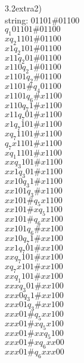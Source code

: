 \documentclass[11pt]{article}
\begin{document}
\noindent3.2extra2)\\
string: 01101\#01100\\
$q_1 0 1 1 0 1 \# 0 1 1 0 0$\\
$x q_2 1 1 0 1 \# 0 1 1 0 0$\\
$x 1 q_2 1 0 1 \# 0 1 1 0 0$\\
$x 1 1 q_2 0 1 \# 0 1 1 0 0$\\
$x 1 1 0 q_2 1 \# 0 1 1 0 0$\\
$x 1 1 0 1 q_2 \# 0 1 1 0 0$\\
$x 1 1 0 1 \# q_4 0 1 1 0 0$\\
$x 1 1 0 1 q_6 \# x 1 1 0 0$\\
$x 1 1 0 q_7 1 \# x 1 1 0 0$\\
$x 1 1 q_7 0 1 \# x 1 1 0 0$\\
$x 1 q_7 1 0 1 \# x 1 1 0 0$\\
$x q_7 1 1 0 1 \# x 1 1 0 0$\\
$q_7 x 1 1 0 1 \# x 1 1 0 0$\\
$x q_1 1 1 0 1 \# x 1 1 0 0$\\
$x x q_3 1 0 1 \# x 1 1 0 0$\\
$x x 1 q_3 0 1 \# x 1 1 0 0$\\
$x x 1 0 q_3 1 \# x 1 1 0 0$\\
$x x 1 0 1 q_3 \# x 1 1 0 0$\\
$x x 1 0 1 \# q_5 x 1 1 0 0$\\
$x x 1 0 1 \# x q_5 1 1 0 0$\\
$x x 1 0 1 \# q_6 x x 1 0 0$\\
$x x 1 0 1 q_6 \# x x 1 0 0$\\
$x x 1 0 q_7 1 \# x x 1 0 0$\\
$x x 1 q_7 0 1 \# x x 1 0 0$\\
$x x q_7 1 0 1 \# x x 1 0 0$\\
$x q_7 x 1 0 1 \# x x 1 0 0$\\
$x x q_1 1 0 1 \# x x 1 0 0$\\
$x x x q_3 0 1 \# x x 1 0 0$\\
$x x x 0 q_3 1 \# x x 1 0 0$\\
$x x x 0 1 q_3 \# x x 1 0 0$\\
$x x x 0 1 \# q_5 x x 1 0 0$\\
$x x x 0 1 \# x q_5 x 1 0 0$\\
$x x x 0 1 \# x x q_5 1 0 0$\\
$x x x 0 1 \# x q_6 x x 0 0$\\
$x x x 0 1 \# q_6 x x x 0 0$\\
\end{document}
